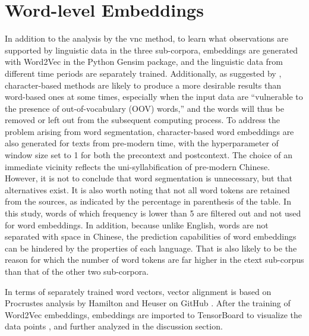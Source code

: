 \section{Word-level Embeddings}
In addition to the analysis by the \gls{vnc} method, to learn what observations are supported by linguistic data in the three sub-corpora, embeddings are generated with Word2Vec in the Python Gensim package, and the linguistic data from different time periods are separately trained. Additionally, as suggested by \textcite{li2019word}, character-based methods are likely to produce a more desirable results than word-based ones at some times, especially when the input data are ``vulnerable to the presence of out-of-vocabulary (OOV) words,'' and the words will thus be removed or left out from the subsequent computing process. To address the problem arising from word segmentation, character-based word embeddings are also generated for texts from pre-modern time, with the hyperparameter of window size set to 1 for both the precontext and postcontext. The choice of an immediate vicinity reflects the uni-syllabification of pre-modern Chinese. However, it is not to conclude that word segmentation is unnecessary, but that alternatives exist.  It is also worth noting that not all word tokens are retained from the sources, as indicated by the percentage in parenthesis of the table. In this study, words of which frequency is lower than 5 are filtered out and not used for word embeddings. In addition, because unlike English, words are not separated with space in Chinese, the prediction capabilities of word embeddings can be hindered by the properties of each language. That is also likely to be the reason for which the number of word tokens are far higher in the \gls{ctext} sub-corpus than that of the other two sub-corpora.

In terms of separately trained word vectors, vector alignment is based on Procrustes analysis by Hamilton and Heuser on GitHub \parencite{hamilton2016law}. After the training of Word2Vec embeddings, embeddings are imported to TensorBoard to visualize the data points \parencite{smilkov2016projector}, and further analyzed in the discussion section.


